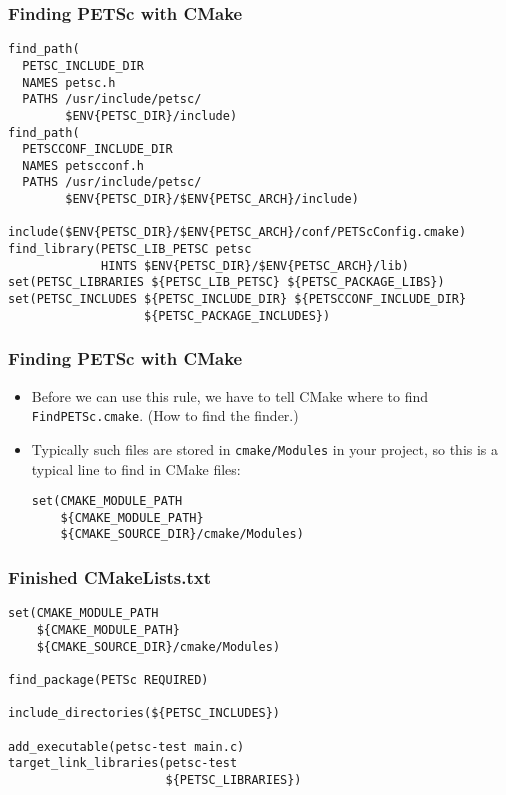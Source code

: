 \begin{frame}[fragile]
  \frametitle{Finding PETSc with CMake}
  \begin{lstlisting}[basicstyle=\ttfamily\scriptsize]
find_path(
  PETSC_INCLUDE_DIR
  NAMES petsc.h
  PATHS /usr/include/petsc/
        $ENV{PETSC_DIR}/include)
find_path(
  PETSCCONF_INCLUDE_DIR
  NAMES petscconf.h
  PATHS /usr/include/petsc/
        $ENV{PETSC_DIR}/$ENV{PETSC_ARCH}/include)

include($ENV{PETSC_DIR}/$ENV{PETSC_ARCH}/conf/PETScConfig.cmake)
find_library(PETSC_LIB_PETSC petsc
             HINTS $ENV{PETSC_DIR}/$ENV{PETSC_ARCH}/lib)
set(PETSC_LIBRARIES ${PETSC_LIB_PETSC} ${PETSC_PACKAGE_LIBS})
set(PETSC_INCLUDES ${PETSC_INCLUDE_DIR} ${PETSCCONF_INCLUDE_DIR}
                   ${PETSC_PACKAGE_INCLUDES})
  \end{lstlisting}
\end{frame}

\begin{frame}[fragile]
  \frametitle{Finding PETSc with CMake}
  \begin{itemize}
  \item Before we can use this rule, we have to tell CMake where to find
    \texttt{FindPETSc.cmake}. (How to find the finder.)
  \item Typically such files are stored in \texttt{cmake/Modules} in your
    project, so this is a typical line to find in CMake files:
    \begin{lstlisting}
set(CMAKE_MODULE_PATH
    ${CMAKE_MODULE_PATH}
    ${CMAKE_SOURCE_DIR}/cmake/Modules)
    \end{lstlisting}
  \end{itemize}
\end{frame}

\begin{frame}[fragile]
  \frametitle{Finished CMakeLists.txt}
  \begin{lstlisting}
set(CMAKE_MODULE_PATH
    ${CMAKE_MODULE_PATH}
    ${CMAKE_SOURCE_DIR}/cmake/Modules)

find_package(PETSc REQUIRED)

include_directories(${PETSC_INCLUDES})

add_executable(petsc-test main.c)
target_link_libraries(petsc-test
                      ${PETSC_LIBRARIES})
  \end{lstlisting}
\end{frame}

